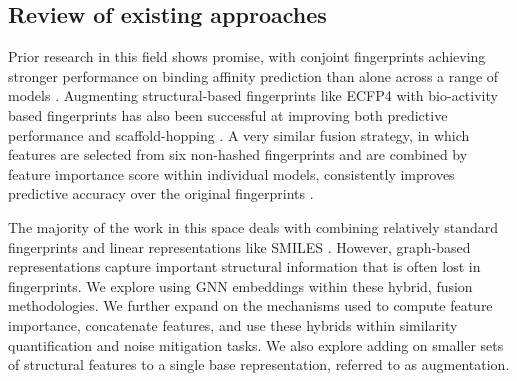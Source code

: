 
\subsection{Review of existing approaches}

Prior research in this field shows promise, with conjoint fingerprints achieving stronger performance on binding affinity prediction than alone across a range of models \citep{Xie2020}. Augmenting structural-based fingerprints like ECFP4 with bio-activity based fingerprints has also been successful at improving both predictive performance and scaffold-hopping \citep{Laufktter2019}. A very similar fusion strategy, in which features are selected from six non-hashed fingerprints and are combined by feature importance score within individual models, consistently improves predictive accuracy over the original fingerprints \citep{Turkina2025}. 

The majority of the work in this space deals with combining relatively standard fingerprints and linear representations like SMILES \citep{Xie2020, Laufktter2019}. However, graph-based representations capture important structural information that is often lost in fingerprints. We explore using GNN embeddings within these hybrid, fusion methodologies. We further expand on the mechanisms used to compute feature importance, concatenate features, and use these hybrids within similarity quantification and noise mitigation tasks. We also explore adding on smaller sets of structural features to a single base representation, referred to as augmentation. 

